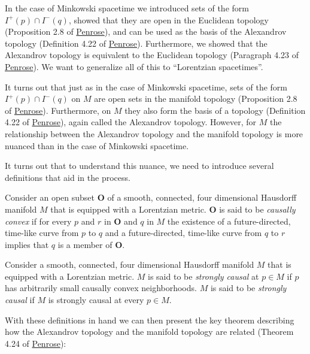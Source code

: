 In the case of Minkowski spacetime we introduced sets of the form $I^+(p) \cap I^-(q)$, showed that they are open in the Euclidean topology (Proposition 2.8 of \href{https://doi.org/10.1137/1.9781611970609}{Penrose}), and can be used as the basis of the Alexandrov topology (Definition 4.22 of \href{https://doi.org/10.1137/1.9781611970609}{Penrose}). Furthermore, we showed that the Alexandrov topology is equivalent to the Euclidean topology (Paragraph 4.23 of \href{https://doi.org/10.1137/1.9781611970609}{Penrose}). We want to generalize all of this to ``Lorentzian spacetimes''.

It turns out that just as in the case of Minkowski spacetime, sets of the form $I^+(p) \cap I^-(q)$ on $M$ are open sets in the manifold topology (Proposition 2.8 of \href{https://doi.org/10.1137/1.9781611970609}{Penrose}). Furthermore, on $M$ they also form the basis of a topology (Definition 4.22 of \href{https://doi.org/10.1137/1.9781611970609}{Penrose}), again called the Alexandrov topology. However, for $M$ the relationship between the Alexandrov topology and the manifold topology is more nuanced than in the case of Minkowski spacetime.

It turns out that to understand this nuance, we need to introduce several definitions that aid in the process.

\begin{definition}
    Consider an open subset $\mathbf{O}$ of a smooth, connected, four dimensional Hausdorff manifold $M$ that is equipped with a Lorentzian metric. $\mathbf{O}$ is said to be \textit{causally convex} if for every $p$ and $r$ in $\mathbf{O}$ and $q$ in $M$ the existence of a future-directed, time-like curve from $p$ to $q$ and a future-directed, time-like curve from $q$ to $r$ implies that $q$ is a member of $\mathbf{O}$.
\end{definition}

\begin{definition}
    Consider a smooth, connected, four dimensional Hausdorff manifold $M$ that is equipped with a Lorentzian metric. $M$ is said to be \textit{strongly causal} at $p \in M$ if $p$ has arbitrarily small causally convex neighborhoods. $M$ is said to be \textit{strongly causal} if $M$ is strongly causal at every $p \in M$.
\end{definition}

With these definitions in hand we can then present the key theorem describing how the Alexandrov topology and the manifold topology are related (Theorem 4.24 of \href{https://doi.org/10.1137/1.9781611970609}{Penrose}):

